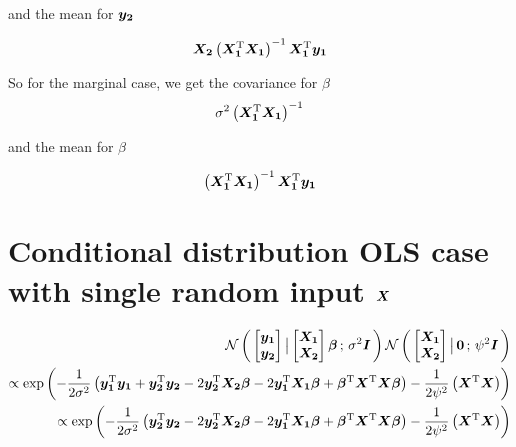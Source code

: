 \documentclass[twoside]{article}
\begin{document}
and the mean for $\bm{y_2}$

\begin{align*}
\bm{X_2}\left(
\bm{X_1}^\mathrm{T}\bm{X_1}
\right)^{-1}
\bm{X_1}^\mathrm{T}\bm{y_1}
\end{align*}

So for the marginal case, we get the covariance for $\beta$
\begin{align*}
\sigma^2
\left(
\bm{X_1}^\mathrm{T}
\bm{X_1}
\right)^{-1}
\end{align*}

and the mean for $\beta$

\begin{align*}
\left(
\bm{X_1}^\mathrm{T}\bm{X_1}
\right)^{-1}
\bm{X_1}^\mathrm{T}\bm{y_1}
\end{align*}

\section{Conditional distribution OLS case with single random input $\bm{X}$}

\begin{align*}
\mathcal{N}\left(\, { {
\begin{bmatrix}
\bm{y_1}\\
\bm{y_2}
\end{bmatrix}
} \, \big| \, {
\begin{bmatrix}
\bm{X_1}\\
\bm{X_2}
\end{bmatrix}    
\bm{\beta}
} } \,;\, { {
\sigma^2
\bm{I}
} } \,\right)
\mathcal{N}\left(\, { {
\begin{bmatrix}
\bm{X_1}\\
\bm{X_2}
\end{bmatrix}
} \, \big| \, {
\bm{0}
} } \,;\, { {
\psi^2
\bm{I}
} } \,\right)
\\
\propto
\exp\left(
-\frac{1}{2\sigma^2}\left(
\bm{y_1}^\mathrm{T}\bm{y_1}  + \bm{y_2}^\mathrm{T}\bm{y_2}
-2\bm{y_2}^\mathrm{T}\bm{X_2}\bm{\beta}-2\bm{y_1}^\mathrm{T}\bm{X_1}\bm{\beta}+\bm{\beta}^\mathrm{T}\bm{X}^\mathrm{T}\bm{X}\bm{\beta}
\right)
-\frac{1}{2\psi^2}\left(
\bm{X}^\mathrm{T}\bm{X}
\right)
\right)
\\
\propto
\exp\left(
-\frac{1}{2\sigma^2}\left(
\bm{y_2}^\mathrm{T}\bm{y_2}
-2\bm{y_2}^\mathrm{T}\bm{X_2}\bm{\beta}-2\bm{y_1}^\mathrm{T}\bm{X_1}\bm{\beta}+\bm{\beta}^\mathrm{T}\bm{X}^\mathrm{T}\bm{X}\bm{\beta}
\right)
-\frac{1}{2\psi^2}\left(
\bm{X}^\mathrm{T}\bm{X}
\right)
\right)
\end{align*}
\end{document}
